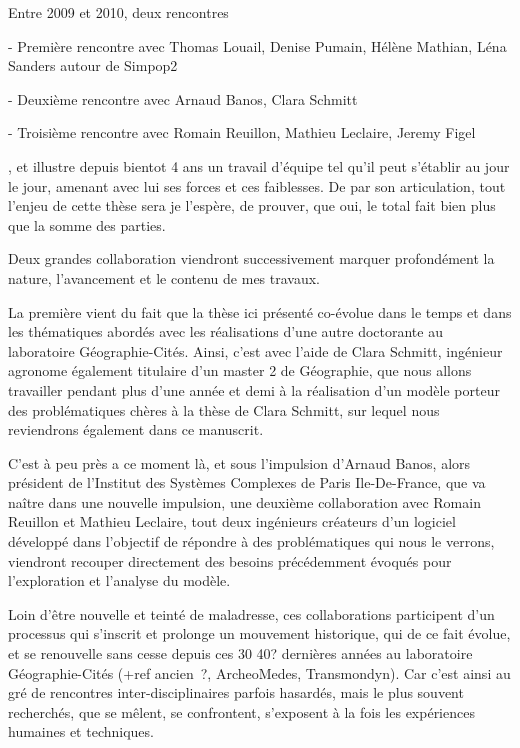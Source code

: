 Entre 2009 et 2010, deux rencontres

- Première rencontre avec Thomas Louail, Denise Pumain, Hélène Mathian, Léna Sanders autour de Simpop2

- Deuxième rencontre avec Arnaud Banos, Clara Schmitt

- Troisième rencontre avec Romain Reuillon, Mathieu Leclaire, Jeremy Figel




 ,  et illustre depuis bientot 4 ans un travail d'équipe tel qu'il peut s'établir au jour le jour, amenant avec lui ses forces et ces faiblesses. De par son articulation, tout l'enjeu de cette thèse sera je l'espère, de prouver, que oui, le total fait bien plus que la somme des parties.

Deux grandes collaboration viendront successivement marquer profondément la nature, l'avancement et le contenu de mes travaux.

La première vient du fait que la thèse ici présenté co-évolue dans le temps et dans les thématiques abordés avec les réalisations d'une autre doctorante au laboratoire Géographie-Cités. Ainsi, c'est avec l'aide de Clara Schmitt, ingénieur agronome également titulaire d'un master 2 de Géographie, que nous allons travailler pendant plus d'une année et demi à la réalisation d'un modèle porteur des problématiques chères à la thèse de Clara Schmitt, sur lequel nous reviendrons également dans ce manuscrit.

C'est à peu près a ce moment là, et sous l'impulsion d'Arnaud Banos, alors président de l'Institut des Systèmes Complexes de Paris Ile-De-France, que va naître dans une nouvelle impulsion, une deuxième collaboration avec Romain Reuillon et Mathieu Leclaire, tout deux ingénieurs créateurs d'un logiciel développé dans l'objectif de répondre à des problématiques qui nous le verrons, viendront recouper directement des besoins précédemment évoqués pour l'exploration et l'analyse du modèle.

Loin d'être nouvelle et teinté de maladresse, ces collaborations participent d'un processus qui s'inscrit et prolonge un mouvement historique, qui de ce fait évolue, et se renouvelle sans cesse depuis ces 30 40? dernières années au laboratoire Géographie-Cités (+ref ancien ?, ArcheoMedes, Transmondyn). Car c'est ainsi  au gré de rencontres inter-disciplinaires parfois hasardés, mais le plus souvent recherchés, que se mêlent, se confrontent, s'exposent à la fois les expériences humaines et techniques.

